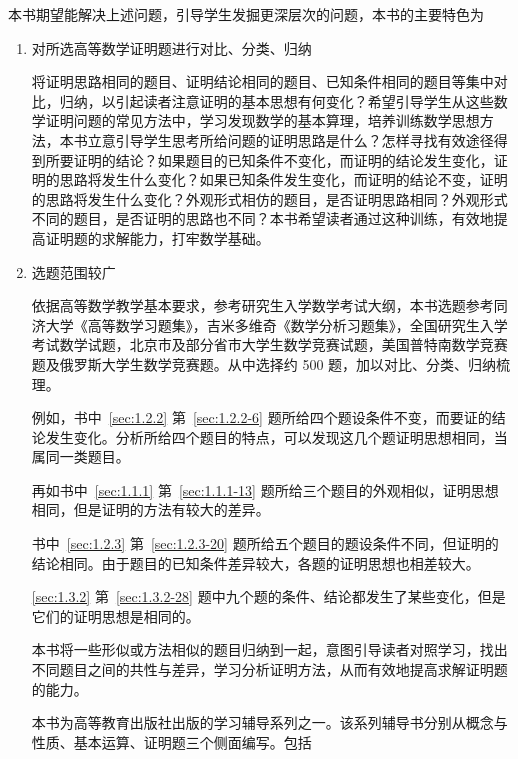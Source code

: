   本书期望能解决上述问题，引导学生发掘更深层次的问题，本书的主要特色为
  \begin{enumerate}
    \item 对所选高等数学证明题进行对比、分类、归纳
    
    将证明思路相同的题目、证明结论相同的题目、已知条件相同的题目等集中对比，归纳，以引起读者注意证明的基本思想有何变化？希望引导学生从这些数学证明问题的常见方法中，学习发现数学的基本算理，培养训练数学思想方法，本书立意引导学生思考所给问题的证明思路是什么？怎样寻找有效途径得到所要证明的结论？如果题目的已知条件不变化，而证明的结论发生变化，证明的思路将发生什么变化？如果已知条件发生变化，而证明的结论不变，证明的思路将发生什么变化？外观形式相仿的题目，是否证明思路相同？外观形式不同的题目，是否证明的思路也不同？本书希望读者通过这种训练，有效地提高证明题的求解能力，打牢数学基础。
    \item 选题范围较广
    
    依据高等数学教学基本要求，参考研究生入学数学考试大纲，本书选题参考同济大学《高等数学习题集》，吉米多维奇《数学分析习题集》，全国研究生入学考试数学试题，北京市及部分省市大学生数学竞赛试题，美国普特南数学竞赛题及俄罗斯大学生数学竞赛题。从中选择约 500 题，加以对比、分类、归纳梳理。

    例如，书中~\ref{sec:1.2.2} 第~\ref{sec:1.2.2-6} 题所给四个题设条件不变，而要证的结论发生变化。分析所给四个题目的特点，可以发现这几个题证明思想相同，当属同一类题目。

    再如书中~\ref{sec:1.1.1} 第~\ref{sec:1.1.1-13} 题所给三个题目的外观相似，证明思想相同，但是证明的方法有较大的差异。

    书中~\ref{sec:1.2.3} 第~\ref{sec:1.2.3-20} 题所给五个题目的题设条件不同，但证明的结论相同。由于题目的已知条件差异较大，各题的证明思想也相差较大。

    \ref{sec:1.3.2} 第~\ref{sec:1.3.2-28} 题中九个题的条件、结论都发生了某些变化，但是它们的证明思想是相同的。

    本书将一些形似或方法相似的题目归纳到一起，意图引导读者对照学习，找出不同题目之间的共性与差异，学习分析证明方法，从而有效地提高求解证明题的能力。

    本书为高等教育出版社出版的学习辅导系列之一。该系列辅导书分别从概念与性质、基本运算、证明题三个侧面编写。包括
\end{enumerate}
